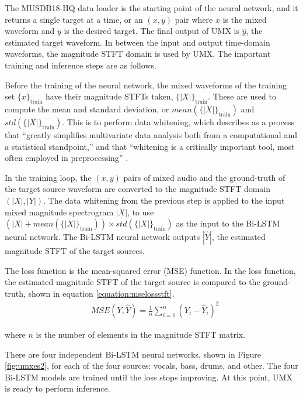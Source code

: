 \documentclass[report.tex]{subfiles}
\begin{document}

The MUSDB18-HQ data loader is the starting point of the neural network, and it returns a single target at a time, or an $(x, y)$ pair where $x$ is the mixed waveform and $y$ is the desired target. The final output of UMX is $\hat{y}$, the estimated target waveform. In between the input and output time-domain waveforms, the magnitude STFT domain is used by UMX. The important training and inference steps are as follows.

Before the training of the neural network, the mixed waveforms of the training set $\{x\}_{\text{train}}$ have their magnitude STFTs taken, $\{|X|\}_{\text{train}}$. These are used to compute the mean and standard deviation, or $\mathit{mean}(\{|X|\}_{\text{train}})$ and $\mathit{std}(\{|X|\}_{\text{train}})$. This is to perform data whitening, which \citeauthor{Kessy_2018} describes as a process that ``greatly simplifies multivariate data analysis both from a computational and a statistical standpoint,'' and that ``whitening is a critically important tool, most often employed in preprocessing'' \parencite[309]{Kessy_2018}.

In the training loop, the $(x, y)$ pairs of mixed audio and the ground-truth of the target source waveform are converted to the magnitude STFT domain $(|X|, |Y|)$. The data whitening from the previous step is applied to the input mixed magnitude spectrogram $|X|$, to use $(|X|+\mathit{mean}(\{|X|\}_{\text{train}}))\times\mathit{std}(\{|X|\}_{\text{train}})$ as the input to the Bi-LSTM neural network. The Bi-LSTM neural network outputs $|\hat{Y}|$, the estimated magnitude STFT of the target sources.

The loss function is the mean-squared error (MSE) function. In the loss function, the estimated magnitude STFT of the target source is compared to the ground-truth, shown in equation \eqref{equation:mselossstft}.
\begin{align}\tag{29}\label{equation:mselossstft}
	\nonumber & \mathit{MSE}(Y, \hat{Y}) = \frac{1}{n} \sum_{i = 1}^{n}{(Y_{i}-\hat{Y}_{i})^{2}}
\end{align}

where $n$ is the number of elements in the magnitude STFT matrix.

There are four independent Bi-LSTM neural networks, shown in Figure \ref{fig:umxes2}, for each of the four sources: vocals, bass, drums, and other. The four Bi-LSTM models are trained until the loss stops improving. At this point, UMX is ready to perform inference.
\end{document}
